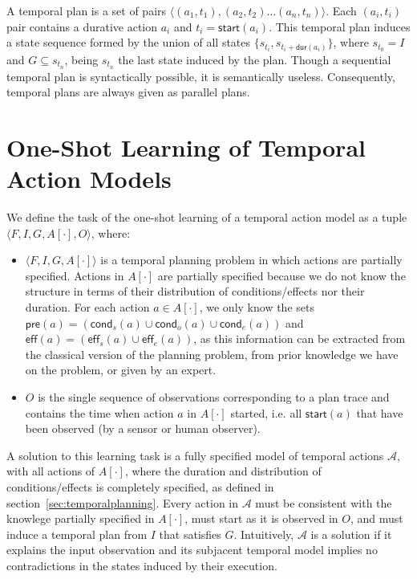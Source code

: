\documentclass[runningheads]{llncs}
\newcommand{\tup}[1]{{\langle #1 \rangle}}
\newcommand{\pre}{\mathsf{pre}}    %
\newcommand{\eff}{\mathsf{eff}}    %
\newcommand{\cond}{\mathsf{cond}}  %
\newcommand{\dur}{\mathsf{dur}}    %
\newcommand{\start}{\mathsf{start}}%
\begin{document}
A temporal plan is a set of pairs $\tup{(a_1,t_1),(a_2,t_2)\ldots (a_n,t_n)}$. Each $(a_i,t_i)$ pair contains a durative action $a_i$ and $t_i=\start(a_i)$.
This temporal plan induces a state sequence formed by the union of all states $\{s_{t_i}, s_{t_i+\dur(a_i)}\}$, where $s_{t_0}=I$ and $G\subseteq s_{t_n}$, being $s_{t_n}$ the last state induced by the plan.
Though a sequential temporal plan is syntactically possible, it is semantically useless. Consequently, temporal plans are always given as parallel plans.


\section{One-Shot Learning of Temporal Action Models}
  \label{sec:learningtask}
  We define the task of the one-shot learning of a temporal action model as a tuple $\tup{F,I,G,A[\cdot],O}$, where:
  \begin{itemize}
  \item $\tup{F,I,G,A[\cdot]}$ is a temporal planning problem in which actions are partially specified.  Actions in $A[\cdot]$ are partially specified because we do not know the structure in terms of their distribution of conditions/effects nor their duration. For each action $a \in A[\cdot]$, we only know the sets $\pre(a)=(\cond_s(a) \cup \cond_o(a) \cup \cond_e(a))$ and $\eff(a)=(\eff_s(a) \cup \eff_e(a))$, as this information can be extracted from the classical version of the planning problem, from prior knowledge we have on the problem, or given by an expert. 
  \item $O$ is the single sequence of observations corresponding to a plan trace and contains the time when action $a$ in $A[\cdot]$ started, i.e. all $\start(a)$ that have been observed (by a sensor or human observer).    
  \end{itemize}    

  A solution to this learning task is a fully specified model of temporal actions $\mathcal{A}$, with all actions of $A[\cdot]$, where the duration and distribution of conditions/effects is completely specified, as defined in section~\ref{sec:temporalplanning}. Every action in $\mathcal{A}$ must be consistent with the knowlege partially specified in $A[\cdot]$, must start as it is observed in $O$, and must induce a temporal plan from $I$ that satisfies $G$. Intuitively, $\mathcal{A}$ is a solution if it explains the input observation and its subjacent temporal model implies no contradictions in the states induced by their execution.
\end{document}
